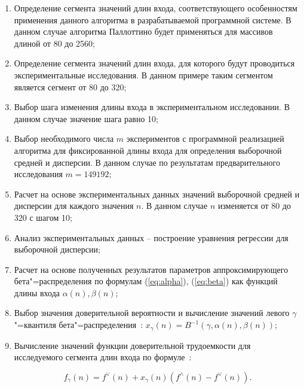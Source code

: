 \documentclass[a4paper,fontsize=14pt]{article}
\begin{document}
\begin{enumerate}
	\item Определение сегмента значений длин входа, соответствующего особенностям применения данного алгоритма в разрабатываемой
	программной системе. В данном случае алгоритма Паллоттино будет применяться для массивов длиной от 80 до 2560;
	
	\item Определение сегмента значений длин входа, для которого будут проводиться экспериментальные исследования. В данном примере таким сегментом является сегмент от 80 до 320;
	
	\item Выбор шага изменения длины входа в экспериментальном исследовании. В данном случае значение шага равно 10;
	
	\item Выбор необходимого числа $m$ экспериментов с программной реализацией алгоритма для фиксированной длины входа для определения выборочной средней и дисперсии. В данном случае по результатам предварительного исследования $m = 149192$;
	
	\item Расчет на основе экспериментальных данных значений выборочной средней и дисперсии для каждого значения $n$. В данном случае $n$ изменяется от 80 до 320 с шагом 10;
	
	\item Анализ экспериментальных данных – построение уравнения регрессии для выборочной дисперсии;
	
	\item Расчет на основе полученных результатов параметров аппроксимирующего бета"=распределения по формулам (\ref{eq:alpha}), (\ref{eq:beta}) как функций длины входа $\alpha(n), \beta(n)$;
	
	\item Выбор значения доверительной вероятности и вычисление значений левого $\gamma$"=квантиля бета"=распределения~\cite{petrushyn_ulyanov_analysis}: $x_\gamma(n) = B^{-1}(\gamma, \alpha(n), \beta(n))$;
	
	\item Вычисление значений функции доверительной трудоемкости для исследуемого сегмента длин входа по формуле~\cite{petrushyn_ulyanov_analysis}:
	
	\begin{equation}\label{eq:final_complexity_fucntion}
	f_\gamma(n) = f^\vee(n) + x_\gamma(n) (f^\wedge(n) - f^\vee(n)).
	\end{equation}
\end{enumerate}
\end{document}
